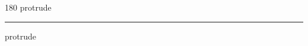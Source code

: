 
\begin{frame}
\begin{center}
\begin{turn}{180}
{\fontsize{2.5cm}{1em}\selectfont protrude}
\end{turn}
\vspace{1em}\par  
\hrule
\vspace{1em}\par  
{\fontsize{2.5cm}{1em}\selectfont protrude}
\end{center}
\end{frame}
